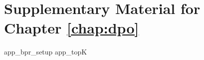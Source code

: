 \section{Supplementary Material for Chapter \ref{chap:dpo}}\label{supplementary-material-ch5}
\graphicspath{{content/chapters/dpo/}}
\let\oldsection\section
\let\section\subsection


{app_bpr_setup}
{app_topK}
\let\section\oldsection
\graphicspath{{./}}
